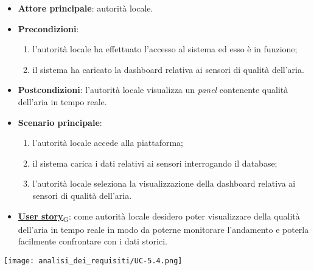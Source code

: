\begin{itemize}
	\item \textbf{Attore principale}: autorità locale.
	\item \textbf{Precondizioni}:
	      \begin{enumerate}
		      \item l'autorità locale ha effettuato l'accesso al sistema ed esso è in funzione;
		      \item il sistema ha caricato la dashboard relativa ai sensori di qualità dell'aria.
	      \end{enumerate}
	\item \textbf{Postcondizioni}: l'autorità locale visualizza un \textit{panel} contenente qualità dell'aria in tempo reale.
	\item \textbf{Scenario principale}:
	      \begin{enumerate}
		      \item l'autorità locale accede alla piattaforma;
		      \item il sistema carica i dati relativi ai sensori interrogando il database;
		      \item l'autorità locale seleziona la visualizzazione della dashboard relativa ai sensori di qualità dell'aria.
	      \end{enumerate}
	\item \href{https://7last.github.io/docs/rtb/documentazione-interna/glossario\#user-story}{\textbf{User story}\textsubscript{G}}:
	      come autorità locale desidero poter visualizzare della qualità dell'aria in tempo reale in modo da poterne monitorare l'andamento
	      e poterla facilmente confrontare con i dati storici.
\end{itemize}
\begin{center}
	\texttt{[image: analisi\_dei\_requisiti/UC-5.4.png]}
\end{center}

